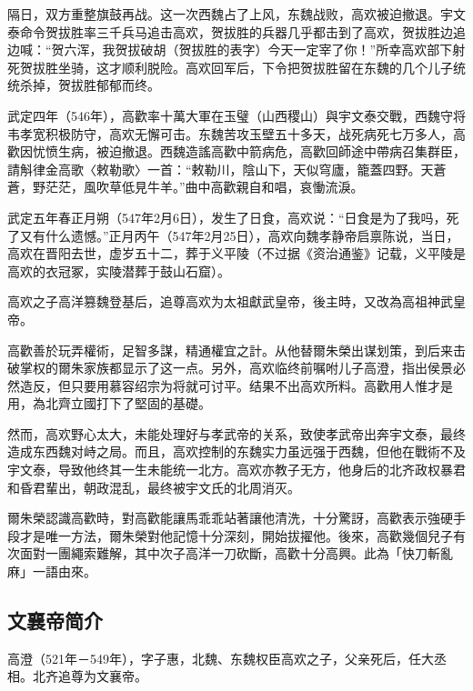 隔日，双方重整旗鼓再战。这一次西魏占了上风，东魏战败，高欢被迫撤退。宇文泰命令贺拔胜率三千兵马追击高欢，贺拔胜的兵器几乎都击到了高欢，贺拔胜边追边喊：“贺六浑，我贺拔破胡（贺拔胜的表字）今天一定宰了你！”所幸高欢部下射死贺拔胜坐骑，这才顺利脱险。高欢回军后，下令把贺拔胜留在东魏的几个儿子统统杀掉，贺拔胜郁郁而终。

武定四年（546年），高歡率十萬大軍在玉璧（山西稷山）與宇文泰交戰，西魏守将韦孝宽积极防守，高欢无懈可击。东魏苦攻玉壁五十多天，战死病死七万多人，高歡因忧愤生病，被迫撤退。西魏造謠高歡中箭病危，高歡回師途中帶病召集群臣，請斛律金高歌〈敕勒歌〉一首：“敕勒川，陰山下，天似穹廬，籠蓋四野。天蒼蒼，野茫茫，風吹草低見牛羊。”曲中高歡親自和唱，哀慟流淚。

武定五年春正月朔（547年2月6日），发生了日食，高欢说：“日食是为了我吗，死了又有什么遗憾。”正月丙午（547年2月25日），高欢向魏孝静帝启禀陈说，当日，高欢在晋阳去世，虚岁五十二，葬于义平陵（不过据《资治通鉴》记载，义平陵是高欢的衣冠冢，实陵潜葬于鼓山石窟）。

高欢之子高洋篡魏登基后，追尊高欢为太祖獻武皇帝，後主時，又改為高祖神武皇帝。

高歡善於玩弄權術，足智多謀，精通權宜之計。从他替爾朱榮出谋划策，到后来击破掌权的爾朱家族都显示了这一点。另外，高欢临终前嘱咐儿子高澄，指出侯景必然造反，但只要用慕容绍宗为将就可讨平。结果不出高欢所料。高歡用人惟才是用，為北齊立國打下了堅固的基礎。

然而，高欢野心太大，未能处理好与孝武帝的关系，致使孝武帝出奔宇文泰，最终造成东西魏对峙之局。而且，高欢控制的东魏实力虽远强于西魏，但他在戰術不及宇文泰，导致他终其一生未能统一北方。高欢亦教子无方，他身后的北齐政权暴君和昏君輩出，朝政混乱，最终被宇文氏的北周消灭。

爾朱榮認識高歡時，對高歡能讓馬乖乖站著讓他清洗，十分驚訝，高歡表示強硬手段才是唯一方法，爾朱榮對他記憶十分深刻，開始拔擢他。後來，高歡幾個兒子有次面對一團繩索難解，其中次子高洋一刀砍斷，高歡十分高興。此為「快刀斬亂麻」一語由來。

\subsection{文襄帝简介}

高澄（521年－549年），字子惠，北魏、东魏权臣高欢之子，父亲死后，任大丞相。北齐追尊为文襄帝。

